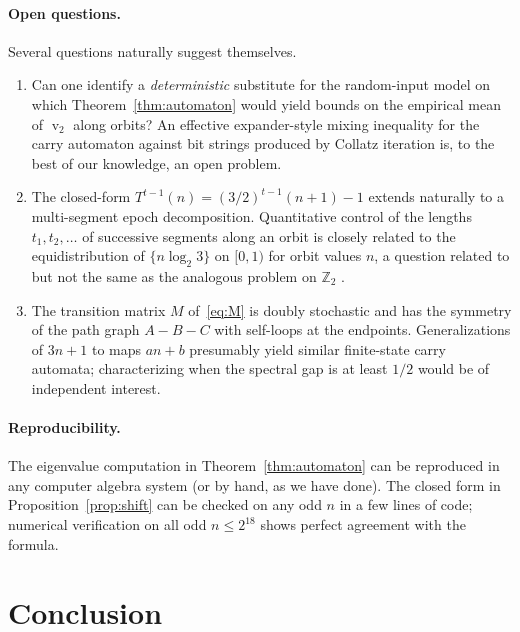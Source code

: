 \documentclass[11pt,a4paper]{article}
\theoremstyle{definition}
\theoremstyle{remark}
\DeclareMathOperator{\val}{v}
\newcommand{\Z}{\mathbb{Z}}
\begin{document}
\paragraph{Open questions.}
Several questions naturally suggest themselves.
\begin{enumerate}[label=(\arabic*),leftmargin=2em]
  \item Can one identify a \emph{deterministic} substitute for the
    random-input model on which Theorem~\ref{thm:automaton} would yield
    bounds on the empirical mean of $\val_2$ along orbits?  An effective
    expander-style mixing inequality for the carry automaton against
    bit strings produced by Collatz iteration is, to the best of our
    knowledge, an open problem.
  \item The closed-form $T^{t-1}(n) = (3/2)^{t-1}(n+1) - 1$ extends
    naturally to a multi-segment epoch decomposition.  Quantitative
    control of the lengths $t_1, t_2, \ldots$ of successive segments
    along an orbit is closely related to the equidistribution of
    $\{n \log_2 3\}$ on $[0, 1)$ for orbit values $n$, a question
    related to but not the same as the analogous problem on $\Z_2$
    \cite{Tao2022}.
  \item The transition matrix $M$ of~\eqref{eq:M} is doubly stochastic
    and has the symmetry of the path graph $A - B - C$ with self-loops at
    the endpoints.  Generalizations of $3n + 1$ to maps $an + b$
    presumably yield similar finite-state carry automata; characterizing
    when the spectral gap is at least $1/2$ would be of independent
    interest.
\end{enumerate}

\paragraph{Reproducibility.}
The eigenvalue computation in Theorem~\ref{thm:automaton} can be
reproduced in any computer algebra system (or by hand, as we have
done).  The closed form in Proposition~\ref{prop:shift} can be checked
on any odd $n$ in a few lines of code; numerical verification on all
odd $n \leq 2^{18}$ shows perfect agreement with the formula.

\section{Conclusion}
\end{document}
